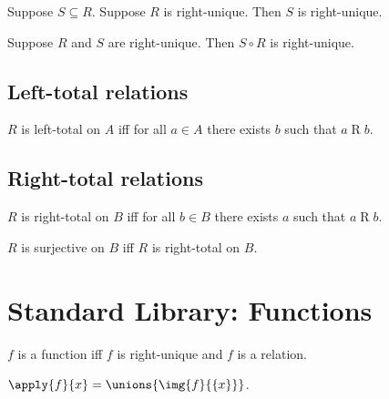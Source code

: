 \begin{proposition}\label{subseteq_of_rightunique_is_rightunique}
    Suppose $S\subseteq R$.
    Suppose $R$ is right-unique.
    Then $S$ is right-unique.
\end{proposition}

\begin{proposition}\label{circ_rightunique}
    Suppose $R$ and $S$ are right-unique.
    Then $S\circ R$ is right-unique.
\end{proposition}



\subsection{Left-total relations}

\begin{definition}\label{lefttotal}
    $R$ is left-total on $A$ iff
    for all $a\in A$ there exists $b$ such that $a\mathrel{R} b$.
\end{definition}


\subsection{Right-total relations}

\begin{definition}\label{righttotal}
    $R$ is right-total on $B$ iff
    for all $b\in B$ there exists $a$ such that $a\mathrel{R} b$.
\end{definition}

\begin{abbreviation}\label{surjective}
    $R$ is surjective on $B$ iff $R$ is right-total on $B$.
\end{abbreviation}

\section{Standard Library: Functions}

\begin{abbreviation}\label{function}
    $f$ is a function iff $f$ is right-unique and $f$ is a relation.
\end{abbreviation}

\begin{definition}\label{apply}
    $\apply{f}{x} = \unions{\img{f}{\{x\}}}$.
\end{definition}


